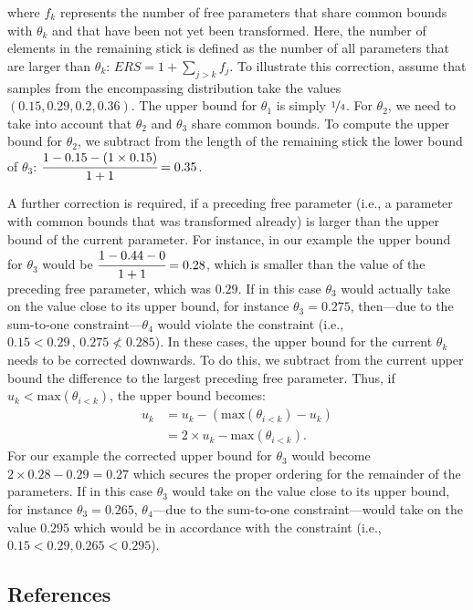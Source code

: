 \begin{appendix}
where \(f_k\) represents the number of free parameters that share common
bounds with \(\theta_k\) and that have been not yet been transformed.
Here, the number of elements in the remaining stick is defined as the
number of all parameters that are larger than \(\theta_k\):
\(ERS = 1 + \sum_{j > k} f_j\). To illustrate this correction, assume
that samples from the encompassing distribution take the values
\((0.15, 0.29, 0.2, 0.36)\). The upper bound for \(\theta_1\) is simply
\(\nicefrac{1}{4}\). For \(\theta_2\), we need to take into account that
\(\theta_2\) and \(\theta_3\) share common bounds. To compute the upper
bound for \(\theta_2\), we subtract from the length of the remaining
stick the lower bound of \(\theta_3\):
\(\cfrac{1 - 0.15 - (1 \times 0.15)}{1 + 1} = 0.35\).

A further correction is required, if a preceding free parameter (i.e., a
parameter with common bounds that was transformed already) is larger
than the upper bound of the current parameter. For instance, in our
example the upper bound for \(\theta_3\) would be
\(\cfrac{1 - 0.44 - 0}{1 + 1} = 0.28\), which is smaller than the value
of the preceding free parameter, which was \(0.29\). If in this case
\(\theta_3\) would actually take on the value close to its upper bound,
for instance \(\theta_3 = 0.275\), then---due to the sum-to-one
constraint---\(\theta_4\) would violate the constraint (i.e.,
\(0.15 < 0.29\, , \, 0.275 \nless 0.285\)). In these cases, the upper
bound for the current \(\theta_k\) needs to be corrected downwards. To
do this, we subtract from the current upper bound the difference to the
largest preceding free parameter. Thus, if
\(u_k < \text{max}(\theta_{i < k})\), the upper bound becomes:
\begin{align}
u_k &= u_k - (\text{max}(\theta_{i < k}) - u_k) \\
    &= 2 \times u_k - \text{max}(\theta_{i < k}).
\end{align} For our example the corrected upper bound for \(\theta_3\)
would become \(2 \times 0.28 - 0.29 = 0.27\) which secures the proper
ordering for the remainder of the parameters. If in this case
\(\theta_3\) would take on the value close to its upper bound, for
instance \(\theta_3 = 0.265\), \(\theta_4\)---due to the sum-to-one
constraint---would take on the value \(0.295\) which would be in
accordance with the constraint (i.e., \(0.15 < 0.29, 0.265 < 0.295\)).

\clearpage

\hypertarget{references}{%
\subsection{References}\label{references}}


\end{appendix}
